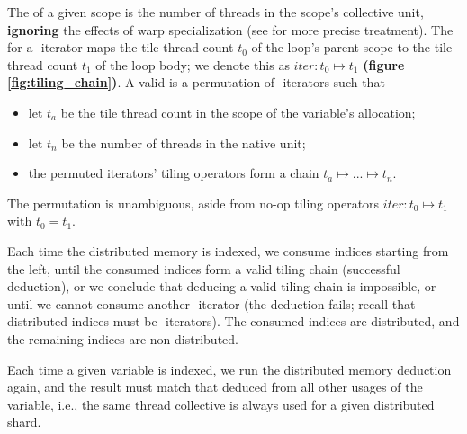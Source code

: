 \begin{figure*}[!b]

\caption{Distributed memory example, with tiling chain annotated}
\label{fig:tiling_chain}
\end{figure*}

\begin{figure*}[!b]

\caption{Distributed memory example, compiled to CUDA C++}
\label{fig:simple_dist_cxx}
\end{figure*}

\filbreak
{} 
The  of a given scope is the number of threads in the scope's collective unit, \textbf{ignoring} the effects of warp specialization (see  for more precise treatment).
The  for a -iterator maps the tile thread count $t_0$ of the loop's parent scope to the tile thread count $t_1$ of the loop body; we denote this as $\mathit{iter}: t_0 \mapsto t_1$ \textbf{(figure \ref{fig:tiling_chain})}.
A valid  is a permutation of -iterators such that
\begin{itemize}
  \item let $t_a$ be the tile thread count in the scope of the variable's allocation;
  \item let $t_n$ be the number of threads in the native unit;
  \item the permuted iterators' tiling operators form a chain $t_a \mapsto ... \mapsto t_n$.
\end{itemize}
\filbreak
The permutation is unambiguous, aside from no-op tiling operators $\mathit{iter}: t_0 \mapsto t_1$ with $t_0 = t_1$.

\filbreak
Each time the distributed memory is indexed, we consume indices starting from the left, until the consumed indices form a valid tiling chain (successful deduction), or we conclude that deducing a valid tiling chain is impossible, or until we cannot consume another -iterator (the deduction fails; recall that distributed indices must be -iterators).
The consumed indices are distributed, and the remaining indices are non-distributed.

\filbreak
{} Each time a given variable is indexed, we run the distributed memory deduction again, and the result must match that deduced from all other usages of the variable, i.e., the same thread collective is always used for a given distributed shard.

